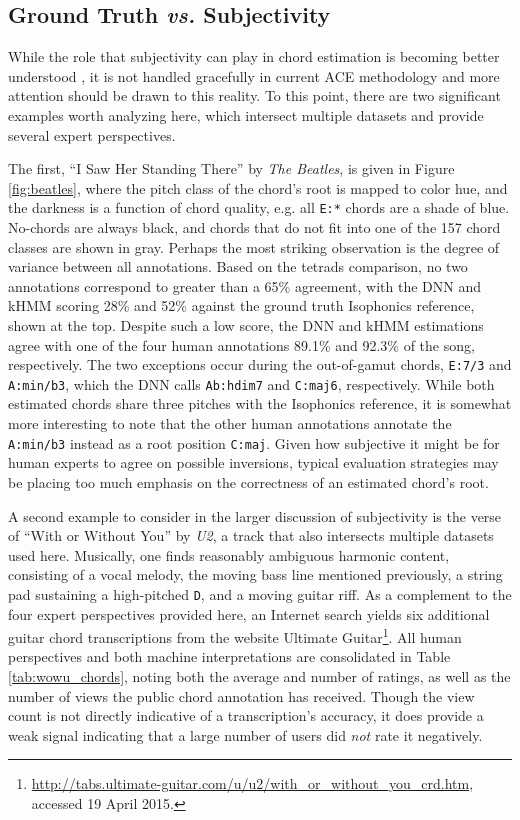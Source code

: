 \documentclass{article}
\begin{document}
\subsection{Ground Truth \emph{vs.} Subjectivity}

While the role that subjectivity can play in chord estimation is becoming better understood \cite{Ni2013Understanding}, it is not handled gracefully in current ACE methodology and more attention should be drawn to this reality.
To this point, there are two significant examples worth analyzing here, which intersect multiple datasets and provide several expert perspectives.

The first, ``I Saw Her Standing There'' by \emph{The Beatles}, is given in Figure \ref{fig:beatles}, where the pitch class of the chord's root is mapped to color hue, and the darkness is a function of chord quality, e.g. all \texttt{E:*} chords are a shade of blue.
No-chords are always black, and chords that do not fit into one of the 157 chord classes are shown in gray.
Perhaps the most striking observation is the degree of variance between all annotations.
Based on the tetrads comparison, no two annotations correspond to greater than a 65\% agreement, with the DNN and kHMM scoring 28\% and 52\% against the ground truth Isophonics reference, shown at the top.
Despite such a low score, the DNN and kHMM estimations agree with one of the four human annotations 89.1\% and 92.3\% of the song, respectively.
The two exceptions occur during the out-of-gamut chords, \texttt{E:7/3} and \texttt{A:min/b3}, which the DNN calls \texttt{Ab:hdim7} and \texttt{C:maj6}, respectively.
While both estimated chords share three pitches with the Isophonics reference, it is somewhat more interesting to note that the other human annotations annotate the \texttt{A:min/b3} instead as a root position \texttt{C:maj}.
Given how subjective it might be for human experts to agree on possible inversions, typical evaluation strategies may be placing too much emphasis on the correctness of an estimated chord's root.

A second example to consider in the larger discussion of subjectivity is the verse of ``With or Without You'' by \emph{U2}, a track that also intersects multiple datasets used here.
Musically, one finds reasonably ambiguous harmonic content, consisting of a vocal melody, the moving bass line mentioned previously, a string pad sustaining a high-pitched \texttt{D}, and a moving guitar riff.
As a complement to the four expert perspectives provided here, an Internet search yields six additional guitar chord transcriptions from the website Ultimate Guitar\footnote{\url{http://tabs.ultimate-guitar.com/u/u2/with_or_without_you_crd.htm},  accessed 19 April 2015.}.
All human perspectives and both machine interpretations are consolidated in Table \ref{tab:wowu_chords}, noting both the average and number of ratings, as well as the number of views the public chord annotation has received.
Though the view count is not directly indicative of a transcription's accuracy, it does provide a weak signal indicating that a large number of users did \emph{not} rate it negatively.
\end{document}
